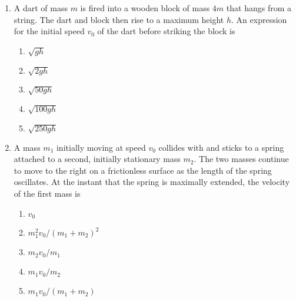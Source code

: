 \documentclass{../../../oss-apphys}
\begin{document}
\begin{multicols}{2}
\begin{enumerate}[resume,leftmargin=18pt]
  \item A dart of mass $m$ is fired into a wooden block of mass $4m$ that hangs
    from a string. The dart and block then rise to a maximum height $h$. An
    expression for the initial speed $v_0$ of the dart before striking the block
    is
    \begin{enumerate}[nosep,leftmargin=18pt,label=(\Alph*)]
    \item$\sqrt{gh}$
    \item$\sqrt{2gh}$
    \item$\sqrt{50gh}$
    \item$\sqrt{100gh}$
    \item$\sqrt{250gh}$
    \end{enumerate}

  \item A mass $m_1$ initially moving at speed $v_0$ collides with and sticks
    to a spring attached to a second, initially stationary mass $m_2$. The two
    masses continue to move to the right on a frictionless surface as the
    length of the spring oscillates. At the instant that the spring is
    maximally extended, the velocity of the first mass is
    \begin{center}
    \end{center}
    \begin{enumerate}[nosep,leftmargin=18pt,label=(\Alph*)]
    \item $v_0$
    \item $m_1^2v_0/(m_1+m_2)^2$
    \item $m_2v_0/m_1$
    \item $m_1v_0/m_2$
    \item $m_1v_0/(m_1+m_2)$
    \end{enumerate}
  \end{enumerate}
  \columnbreak
  

\end{multicols}
\end{document}
